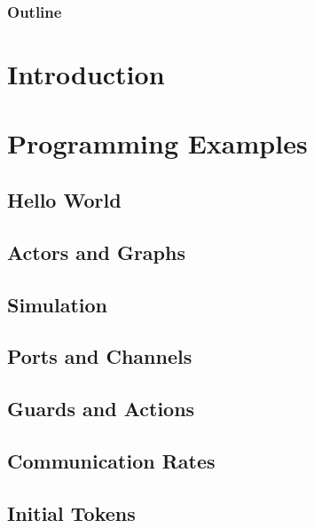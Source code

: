\newcommand{\SysteMoC}{\emph{SysteMoC}}
\newcommand{\SystemCoDesigner}{\emph{SystemCoDesigner}}
\newcommand{\concat}{{}^{\smallfrown}}
\newcommand{\length}{\#}

\makeindex



\frame[plain,c]{\titlepage} %

 {
  \lstset{commentstyle=\scriptsize\selectfont}
  \lstset{basicstyle=\scriptsize\ttfamily\selectfont}
}

\begin{frame}
  \frametitle{Outline}
  \tableofcontents[hideallsubsections]
\end{frame}

\section{Introduction}


\section{Programming Examples}
\subsection{Hello World}

\subsection{Actors and Graphs}

\subsection{Simulation}

\subsection{Ports and Channels}

\subsection{Guards and Actions}

\subsection{Communication Rates}

\subsection{Initial Tokens}

%

